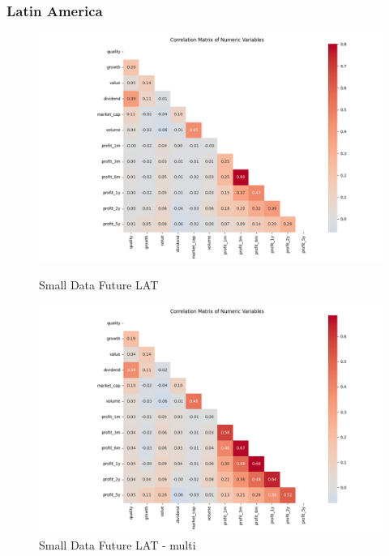 \documentclass[11pt,english,a4paper,hidelinks]{book}
\begin{document}
\subsubsection{Latin America}
\begin{figure}[H]
    \centering
    \begin{minipage}{0.48\textwidth}
        \centering
        \includegraphics[width=\linewidth]{images/code/descriptive analysis/correlations/Small Data future LAT.png}
        \caption{Small Data Future LAT}
        \label{fig:small_data_future_lat_correlations}
    \end{minipage}
    \begin{minipage}{0.48\textwidth}
        \centering
        \includegraphics[width=\linewidth]{images/code/descriptive analysis/correlations/Small Data future LAT - Multi.png}
        \caption{Small Data Future LAT - \acrshort{multi}}
        \label{fig:small_data_future_lat_multi_correlations}
    \end{minipage}
\end{figure}
\end{document}
